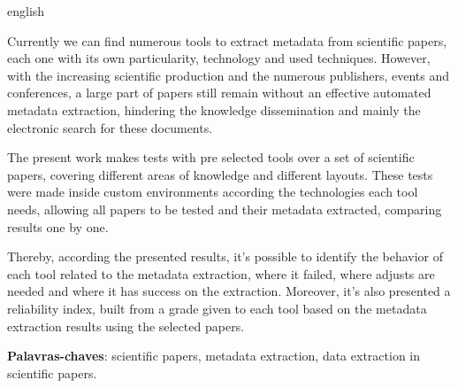 \begin{resumo}[Abstract]
\begin{otherlanguage*}{english}

Currently we can find numerous tools to extract metadata from scientific papers, each one with its own particularity, technology and used techniques. 
However, with the increasing scientific production and the numerous publishers, events and conferences, a large part of papers still remain without an effective automated metadata extraction, 
hindering the knowledge dissemination and mainly the electronic search for these documents. 

The present work makes tests with pre selected tools over a set of scientific papers, covering different areas of knowledge and different layouts. 
These tests were made inside custom environments according the technologies each tool needs, allowing all papers to be tested and their metadata extracted, comparing results one by one. 

Thereby, according the presented results, it's possible to identify the behavior of each tool related to the metadata extraction, where it failed, where adjusts are needed and where it has success on the extraction. 
Moreover, it's also presented a reliability index, built from a grade given to each tool based on the metadata extraction results using the selected papers.

\textbf{Palavras-chaves}: scientific papers, metadata extraction, data extraction in scientific papers.


\end{otherlanguage*}
\end{resumo}

 

  

